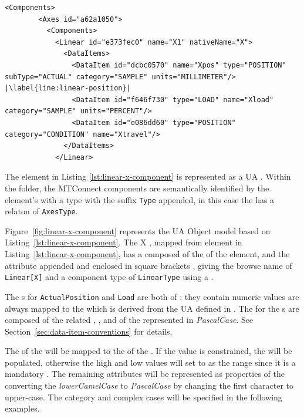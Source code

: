 \begin{lstlisting}[firstnumber=last,escapechar=|,%
    caption={Components and Conditions},label={lst:linear-x-component}]
      <Components>
        <Axes id="a62a1050">
          <Components>
            <Linear id="e373fec0" name="X1" nativeName="X">
              <DataItems>
                <DataItem id="dcbc0570" name="Xpos" type="POSITION" subType="ACTUAL" category="SAMPLE" units="MILLIMETER"/> |\label{line:linear-position}|
                <DataItem id="f646f730" type="LOAD" name="Xload" category="SAMPLE" units="PERCENT"/>
                <DataItem id="e086dd60" type="POSITION" category="CONDITION" name="Xtravel"/>
              </DataItems>
            </Linear>
\end{lstlisting}

The  element in Listing \ref{lst:linear-x-component} is represented as a UA . Within the folder, the MTConnect components are semantically identified by the element's  with a type with the suffix \texttt{Type} appended, in this case the    has a  relaton of \texttt{AxesType}. 



Figure~\ref{fig:linear-x-component} represents the UA Object model based on  Listing~\ref{lst:linear-x-component}. The  X , mapped from  element in Listing~\ref{lst:linear-x-component}, has a  composed of the  of the element, and the  attribute appended and enclosed in square brackets \element{[X]}, giving the browse name of \texttt{Linear[X]} and a component type of \texttt{LinearType} using a  .

The s for \texttt{ActualPosition} and \texttt{Load} are both of  ; they contain numeric values are always mapped to the  which is derived from the UA  defined in \cite{UAPart8}. The  for the s are composed of the related  , , and  of the  represented in \textit{PascalCase}. See Section~\ref{sec:data-item-conventions} for details.

The  of the  will be mapped to the   of the . If the value is constrained, the  will be populated, otherwise the high and low values will set to  as the range since it is a mandatory . The remaining attributes will be represented as properties of the  converting the \textit{lowerCamelCase} to \textit{PascalCase} by changing the first character to upper-case. The  category and complex cases will be specified in the following examples.

